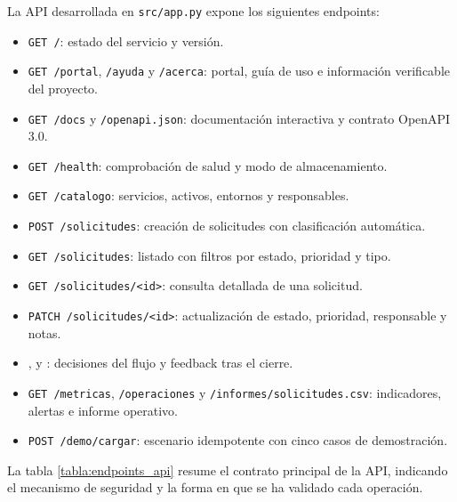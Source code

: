 La API desarrollada en \texttt{src/app.py} expone los siguientes endpoints:

\begin{itemize}
    \item \texttt{GET /}: estado del servicio y versión.
    \item \texttt{GET /portal}, \texttt{/ayuda} y \texttt{/acerca}: portal, guía de uso e información verificable del proyecto.
    \item \texttt{GET /docs} y \texttt{/openapi.json}: documentación interactiva y contrato OpenAPI 3.0.
    \item \texttt{GET /health}: comprobación de salud y modo de almacenamiento.
    \item \texttt{GET /catalogo}: servicios, activos, entornos y responsables.
    \item \texttt{POST /solicitudes}: creación de solicitudes con clasificación automática.
    \item \texttt{GET /solicitudes}: listado con filtros por estado, prioridad y tipo.
    \item \texttt{GET /solicitudes/<id>}: consulta detallada de una solicitud.
    \item \texttt{PATCH /solicitudes/<id>}: actualización de estado, prioridad, responsable y notas.
    \item {},  y : decisiones del flujo y feedback tras el cierre.
    \item \texttt{GET /metricas}, \texttt{/operaciones} y \texttt{/informes/solicitudes.csv}: indicadores, alertas e informe operativo.
    \item \texttt{POST /demo/cargar}: escenario idempotente con cinco casos de demostración.
\end{itemize}

La tabla \ref{tabla:endpoints_api} resume el contrato principal de la API, indicando el mecanismo de seguridad y la forma en que se ha validado cada operación.

